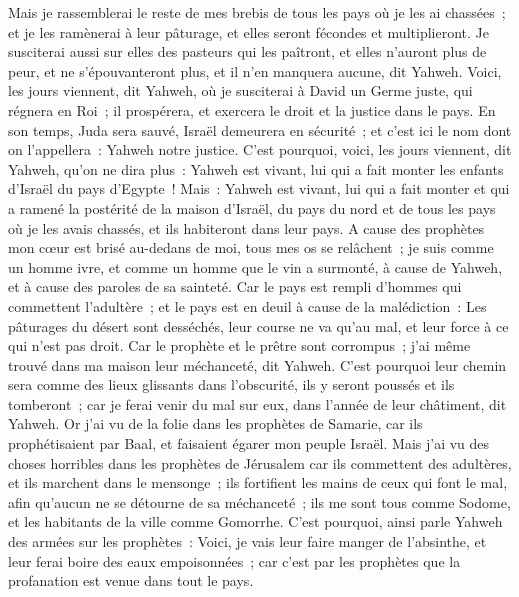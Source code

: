 \begin{multicols}{2}
Mais je rassemblerai le reste de mes brebis de tous les pays où je les ai chassées~; et je les ramènerai à leur pâturage, et elles seront fécondes et multiplieront.
Je susciterai aussi sur elles des pasteurs qui les paîtront, et elles n'auront plus de peur, et ne s'épouvanteront plus, et il n'en manquera aucune, dit Yahweh.
Voici, les jours viennent, dit Yahweh, où je susciterai à David un Germe juste, qui régnera en Roi~; il prospérera, et exercera le droit et la justice dans le pays.
En son temps, Juda sera sauvé, Israël demeurera en sécurité~; et c'est ici le nom dont on l'appellera~: Yahweh notre justice.
C'est pourquoi, voici, les jours viennent, dit Yahweh, qu'on ne dira plus~: Yahweh est vivant, lui qui a fait monter les enfants d'Israël du pays d'Egypte~!
Mais~: Yahweh est vivant, lui qui a fait monter et qui a ramené la postérité de la maison d'Israël, du pays du nord et de tous les pays où je les avais chassés, et ils habiteront dans leur pays.
A cause des prophètes mon cœur est brisé au-dedans de moi, tous mes os se relâchent~; je suis comme un homme ivre, et comme un homme que le vin a surmonté, à cause de Yahweh, et à cause des paroles de sa sainteté.
Car le pays est rempli d'hommes qui commettent l'adultère~; et le pays est en deuil à cause de la malédiction~: Les pâturages du désert sont desséchés, leur course ne va qu'au mal, et leur force à ce qui n'est pas droit.
Car le prophète et le prêtre sont corrompus~; j'ai même trouvé dans ma maison leur méchanceté, dit Yahweh.
C'est pourquoi leur chemin sera comme des lieux glissants dans l'obscurité, ils y seront poussés et ils tomberont~; car je ferai venir du mal sur eux, dans l'année de leur châtiment, dit Yahweh.
Or j'ai vu de la folie dans les prophètes de Samarie, car ils prophétisaient par Baal, et faisaient égarer mon peuple Israël.
Mais j'ai vu des choses horribles dans les prophètes de Jérusalem car ils commettent des adultères, et ils marchent dans le mensonge~; ils fortifient les mains de ceux qui font le mal, afin qu'aucun ne se détourne de sa méchanceté~; ils me sont tous comme Sodome, et les habitants de la ville comme Gomorrhe.
C'est pourquoi, ainsi parle Yahweh des armées sur les prophètes~: Voici, je vais leur faire manger de l'absinthe, et leur ferai boire des eaux empoisonnées~; car c'est par les prophètes que la profanation est venue dans tout le pays.

\end{multicols}

